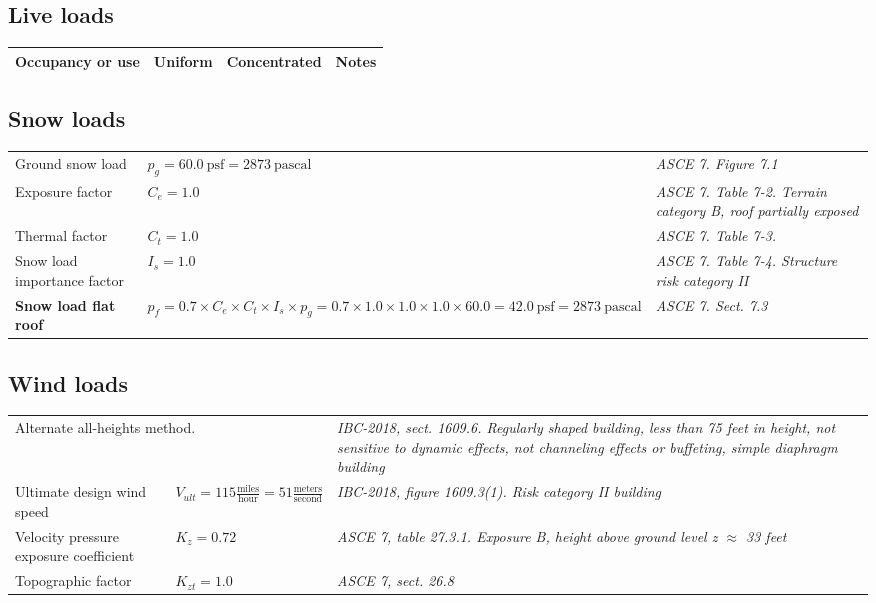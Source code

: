 \subsection{Live loads}
\begin{tabular}{p{5cm}p{2.5cm}|p{2.5cm}|p{4cm}}
\textbf{Occupancy or use} & \textbf{Uniform} & \textbf{Concentrated} & \textbf{Notes}\\
\hline

\end{tabular}

\subsection{Snow loads}
\begin{tabular}{p{5cm}p{5cm}|p{5cm}}
Ground snow load & $p_g = 60.0\ \mathrm{psf} = 2873 \ \mathrm{pascal}$ & \emph{ASCE 7. Figure 7.1}\\
Exposure factor & $C_e = 1.0$ &  \emph{ASCE 7. Table 7-2. Terrain category B, roof partially exposed} \\
Thermal factor &  $C_t = 1.0$ & \emph{ASCE 7. Table 7-3.}\\
Snow load importance factor & $I_s = 1.0$ & \emph{ASCE 7. Table 7-4. Structure risk category II}\\
\textbf{Snow load flat roof} & $p_f = 0.7 \times C_e \times C_t \times  I_s\times p_g = 0.7 \times 1.0 \times 1.0 \times 1.0 \times 60.0 = 42.0\ \mathrm{psf} = 2873 \ \mathrm{pascal}$ & \emph{ASCE 7. Sect. 7.3}\\
\end{tabular}

\subsection{Wind loads}
\begin{tabular}{p{5cm}l|p{5cm}}
\multicolumn{2}{l|}{Alternate all-heights method.} & \emph{IBC-2018, sect. 1609.6.  Regularly shaped building, less than 75 feet in height, not sensitive to dynamic effects, not channeling effects or buffeting, simple diaphragm building} \\
Ultimate design wind speed & $V_{ult} = 115 \frac{\mathrm{miles}}{\mathrm{hour}} = 51 \frac{\mathrm{meters}}{\mathrm{second}} $& \emph{IBC-2018, figure 1609.3(1). Risk category II building}\\
Velocity pressure exposure coefficient & $K_z = 0.72$ & \emph{ASCE 7, table 27.3.1. Exposure B, height above ground level z $\approx$ 33 feet} \\
Topographic factor & $K_{zt} = 1.0 $ & \emph{ASCE 7, sect. 26.8} \\
\end{tabular}

